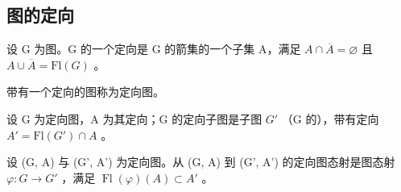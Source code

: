 \subsection{图的定向}

设 G 为图。G 的一个定向是 G 的箭集的一个子集 A，满足 \(A \cap \overline{A} = \varnothing\) 且 \(A \cup \overline{A} = \mathrm{Fl}(G)\) 。

带有一个定向的图称为定向图。

设 G 为定向图，A 为其定向；G 的定向子图是子图 \(G'\) （G 的），带有定向 \(A' = \mathrm{Fl}(G') \cap A\) 。

设 (G, A) 与 (G', A') 为定向图。从 (G, A) 到 (G', A') 的定向图态射是图态射 \(\varphi\colon G \to G'\) ，满足 \(\operatorname{Fl}(\varphi)(A) \subset A'\) 。

